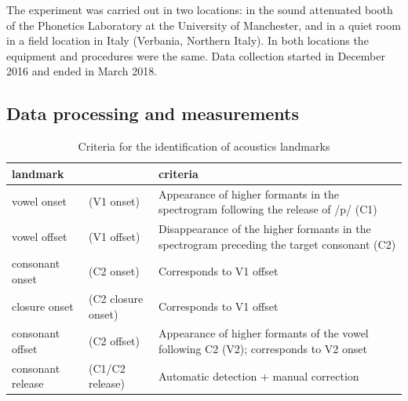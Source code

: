 \documentclass[charis]{glossa}
\begin{document}
The experiment was carried out in two locations: in the sound attenuated
booth of the Phonetics Laboratory at the University of Manchester, and
in a quiet room in a field location in Italy (Verbania, Northern Italy).
In both locations the equipment and procedures were the same. Data
collection started in December 2016 and ended in March 2018.

\hypertarget{data-processing-and-measurements}{%
\subsection{Data processing and
measurements}\label{data-processing-and-measurements}}

\begin{table}
\caption{Criteria for the identification of acoustics landmarks}
\label{t:dur-measures}
\centering
\begin{tabular}[t]{llp{5cm}}
\toprule
\textbf{landmark}               &                  & \textbf{criteria}                                                                                    \\ \midrule
vowel onset           & (V1 onset)         & Appearance of higher formants in the spectrogram following the release of /p/ (C1)            \\
vowel offset          & (V1 offset)        & Disappearance of the higher formants in the spectrogram preceding the target consonant (C2) \\
consonant onset       & (C2 onset)         & Corresponds to V1 offset                                                                    \\
closure onset         & (C2 closure onset) & Corresponds to V1 offset                                                                    \\
consonant offset      & (C2 offset)        & Appearance of higher formants of the vowel following C2 (V2); corresponds to V2 onset                                \\
consonant release & (C1/C2 release)         & Automatic detection + manual correction \citep{ananthapadmanabha2014}                                           \\ \bottomrule
\end{tabular}
\end{table}
\end{document}
